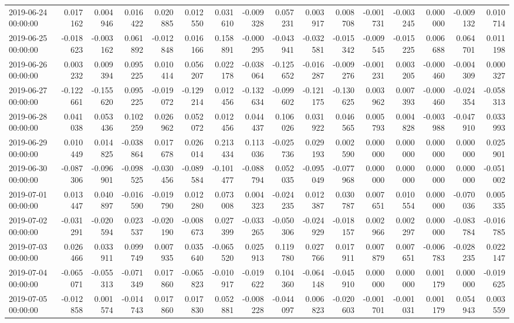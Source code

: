 \begin{tabular}{lrrrrrrrrrrrrrrr}
2019-06-24 00:00:00 & 0.017162 & 0.004946 & 0.016422 & 0.020885 & 0.012550 & 0.031610 & -0.009328 & 0.057231 & 0.003917 & 0.008708 & -0.001731 & -0.003245 & 0.000000 & -0.009132 & 0.010714 \\
2019-06-25 00:00:00 & -0.018623 & -0.003162 & 0.061892 & -0.012848 & 0.016166 & 0.158891 & -0.000295 & -0.043941 & -0.032581 & -0.015342 & -0.009545 & -0.015225 & 0.006688 & 0.064701 & 0.011198 \\
2019-06-26 00:00:00 & 0.003232 & 0.009394 & 0.095225 & 0.010414 & 0.056207 & 0.022178 & -0.038064 & -0.125652 & -0.016287 & -0.009276 & -0.001231 & 0.003205 & -0.000460 & -0.004309 & 0.000327 \\
2019-06-27 00:00:00 & -0.122661 & -0.155620 & 0.095225 & -0.019072 & -0.129214 & 0.012456 & -0.132634 & -0.099602 & -0.121175 & -0.130625 & 0.003962 & 0.007393 & -0.000460 & -0.024354 & -0.058313 \\
2019-06-28 00:00:00 & 0.041038 & 0.053436 & 0.102259 & 0.026962 & 0.052072 & 0.012456 & 0.044437 & 0.106026 & 0.031922 & 0.046565 & 0.005793 & 0.004828 & -0.003988 & -0.047910 & 0.033993 \\
2019-06-29 00:00:00 & 0.010449 & 0.014825 & -0.038864 & 0.017678 & 0.026014 & 0.213434 & 0.113036 & -0.025736 & 0.029193 & 0.002590 & 0.000000 & 0.000000 & 0.000000 & 0.000000 & 0.025901 \\
2019-06-30 00:00:00 & -0.087306 & -0.096901 & -0.098525 & -0.030456 & -0.089584 & -0.101477 & -0.088794 & 0.052035 & -0.095049 & -0.077968 & 0.000000 & 0.000000 & 0.000000 & 0.000000 & -0.051002 \\
2019-07-01 00:00:00 & 0.013447 & 0.040897 & -0.016590 & -0.019790 & 0.012280 & 0.073008 & 0.004323 & -0.024235 & 0.012387 & 0.030787 & 0.007651 & 0.010554 & 0.000000 & -0.070036 & 0.005335 \\
2019-07-02 00:00:00 & -0.031291 & -0.020594 & 0.023537 & -0.020190 & -0.008673 & 0.027399 & -0.033265 & -0.050306 & -0.024929 & -0.018157 & 0.002966 & 0.002297 & 0.000000 & -0.083784 & -0.016785 \\
2019-07-03 00:00:00 & 0.026466 & 0.033911 & 0.099749 & 0.007935 & 0.035640 & -0.065520 & 0.025913 & 0.119780 & 0.027766 & 0.017911 & 0.007879 & 0.007651 & -0.006783 & -0.028235 & 0.022147 \\
2019-07-04 00:00:00 & -0.065071 & -0.055313 & -0.071349 & 0.017860 & -0.065823 & -0.010917 & -0.019622 & 0.104360 & -0.064148 & -0.045910 & 0.000000 & 0.000000 & 0.001179 & 0.000000 & -0.019625 \\
2019-07-05 00:00:00 & -0.012858 & 0.001574 & -0.014743 & 0.017860 & 0.017830 & 0.052881 & -0.008228 & -0.044097 & 0.006823 & -0.020603 & -0.001701 & -0.001031 & 0.001179 & 0.054943 & 0.003559 \\

\end{tabular}
